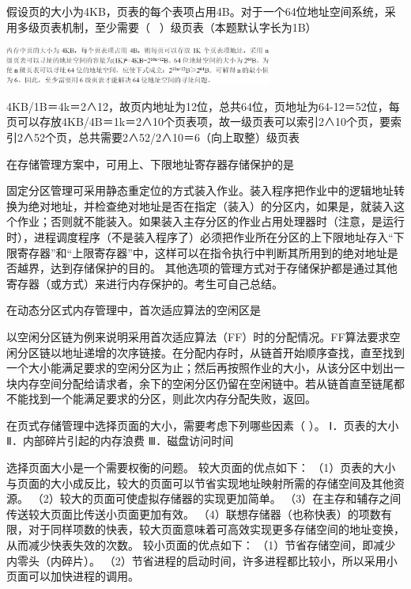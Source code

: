 \question 假设页的大小为4KB，页表的每个表项占用4B。对于一个64位地址空间系统，采用多级页表机制，至少需要（
~）级页表（本题默认字长为1B）
\par{}
\begin{solution}\includegraphics[width=3.46875in,height=0.50000in]{computerassets/243B0B774FFA6638E6FAB305AD26DD03.png}

4KB/1B＝4k＝2∧12，故页内地址为12位，总共64位，页地址为64-12＝52位，每页可以存放4KB/4B＝1k＝2∧10个页表项，故一级页表可以索引2∧10个页，要索引2∧52个页，总共需要2∧52/2∧10＝6（向上取整）级页表
\end{solution}
\question 在存储管理方案中，可用上、下限地址寄存器存储保护的是
\par{}
\begin{solution}固定分区管理可采用静态重定位的方式装入作业。装入程序把作业中的逻辑地址转换为绝对地址，并检查绝对地址是否在指定（装入）的分区内，如果是，就装入这个作业；否则就不能装入。如果装入主存分区的作业占用处理器时（注意，是运行时），进程调度程序（不是装入程序了）必须把作业所在分区的上下限地址存入``下限寄存器''和``上限寄存器''中，这样可以在指令执行中判断其所用到的绝对地址是否越界，达到存储保护的目的。
其他选项的管理方式对于存储保护都是通过其他寄存器（或方式）来进行内存保护的。考生可自己总结。
\end{solution}
\question 在动态分区式内存管理中，首次适应算法的空闲区是
\par{}
\begin{solution}以空闲分区链为例来说明采用首次适应算法（FF）时的分配情况。FF算法要求空闲分区链以地址递增的次序链接。在分配内存时，从链首开始顺序查找，直至找到一个大小能满足要求的空闲分区为止；然后再按照作业的大小，从该分区中划出一块内存空间分配给请求者，余下的空闲分区仍留在空闲链中。若从链首直至链尾都不能找到一个能满足要求的分区，则此次内存分配失败，返回。
\end{solution}
\question 在页式存储管理中选择页面的大小，需要考虑下列哪些因素（ ）。
Ⅰ．页表的大小 Ⅱ．内部碎片引起的内存浪费 Ⅲ．磁盘访问时间
\par{}
\begin{solution}选择页面大小是一个需要权衡的问题。 较大页面的优点如下：
（1）页表的大小与页面的大小成反比，较大的页面可以节省实现地址映射所需的存储空间及其他资源。
（2）较大的页面可使虚拟存储器的实现更加简单。
（3）在主存和辅存之间传送较大页面比传送小页面更加有效。
（4）联想存储器（也称快表）的项数有限，对于同样项数的快表，较大页面意味着可高效实现更多存储空间的地址变换，从而减少快表失效的次数。
较小页面的优点如下： （1）节省存储空间，即减少内零头（内碎片）。
（2）节省进程的启动时间，许多进程都比较小，所以采用小页面可以加快进程的调用。
\end{solution}
